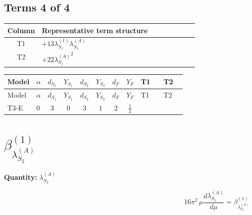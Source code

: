 \documentclass[8pt]{article}
\begin{document}
\begin{landscape}
\subsection*{Terms 4 of 4}
\begin{center}
\begin{tabular}{@{}c >{\raggedright\arraybackslash}p{0.82\linewidth}@{}}
\toprule
Column & Representative term structure \\
\midrule
T1 & \(\displaystyle +13 {\lambda_{S_1}^{(1)}} {\lambda_{S_1}^{(A)}}\) \\
\midrule
T2 & \(\displaystyle +22 {\lambda_{S_1}^{(A)}}^2\) \\
\midrule
\bottomrule
\end{tabular}
\end{center}
\smallskip
\tiny
\begin{longtable}{@{}llcccccc >{\raggedright\arraybackslash}p{0.21\linewidth} >{\raggedright\arraybackslash}p{0.21\linewidth}@{}}
\toprule
Model & $\alpha$ & $d_{S_1}$ & $Y_{S_1}$ & $d_{S_2}$ & $Y_{S_2}$ & $d_F$ & $Y_F$ & T1 & T2 \\
\midrule
\endfirsthead
\toprule
Model & $\alpha$ & $d_{S_1}$ & $Y_{S_1}$ & $d_{S_2}$ & $Y_{S_2}$ & $d_F$ & $Y_F$ & T1 & T2 \\
\midrule
\endhead
T3-E & $0$ & $3$ & $0$ & $3$ & $1$ & $2$ & $\frac{1}{2}$ & \scriptsize\adjustbox{max width=\linewidth}{$\begin{gathered} +13 {\lambda_{S_1}^{(1)}} {\lambda_{S_1}^{(A)}}\end{gathered}$} & \scriptsize\adjustbox{max width=\linewidth}{$\begin{gathered} +22 {\lambda_{S_1}^{(A)}}^2\end{gathered}$} \\
\midrule
\bottomrule
\end{longtable}
\clearpage
\section*{$\beta_{\lambda_{S_2}^{(A)}}^{(1)}$}
\noindent\textbf{Quantity: }$\lambda_{S_2}^{(A)}$\par\smallskip
\[16\pi^2\,\mu\frac{d \lambda_{S_2}^{(A)}}{d\mu}=\beta_{\lambda_{S_2}^{(A)}}^{(1)}\]

\end{landscape}
\end{document}
